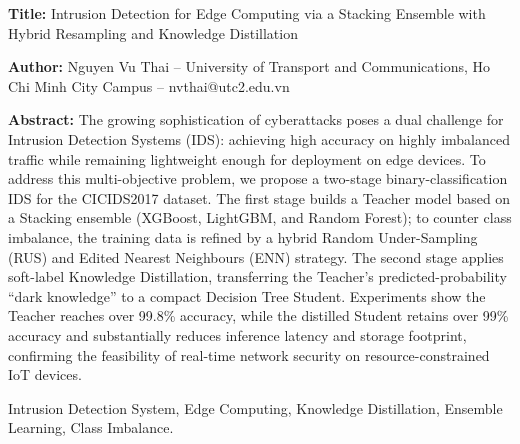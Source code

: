 \documentclass[conference]{IEEEtran}
\begin{document}


\vspace{0.8em}
\noindent\textbf{Title:} Intrusion Detection for Edge Computing via a Stacking Ensemble with Hybrid Resampling and Knowledge Distillation\par
\noindent\textbf{Author:} Nguyen Vu Thai -- University of Transport and Communications, Ho Chi Minh City Campus -- nvthai@utc2.edu.vn\par
\vspace{0.3em}
\noindent\textbf{Abstract:} The growing sophistication of cyberattacks poses a dual challenge for Intrusion Detection Systems (IDS): achieving high accuracy on highly imbalanced traffic while remaining lightweight enough for deployment on edge devices. To address this multi-objective problem, we propose a two-stage binary-classification IDS for the CICIDS2017 dataset. The first stage builds a Teacher model based on a Stacking ensemble (XGBoost, LightGBM, and Random Forest); to counter class imbalance, the training data is refined by a hybrid Random Under-Sampling (RUS) and Edited Nearest Neighbours (ENN) strategy. The second stage applies soft-label Knowledge Distillation, transferring the Teacher's predicted-probability ``dark knowledge'' to a compact Decision Tree Student. Experiments show the Teacher reaches over 99.8\% accuracy, while the distilled Student retains over 99\% accuracy and substantially reduces inference latency and storage footprint, confirming the feasibility of real-time network security on resource-constrained IoT devices.\par

\begin{IEEEkeywords}
Intrusion Detection System, Edge Computing, Knowledge Distillation, Ensemble Learning, Class Imbalance.
\end{IEEEkeywords}


%
\IEEEpeerreviewmaketitle












\end{document}
